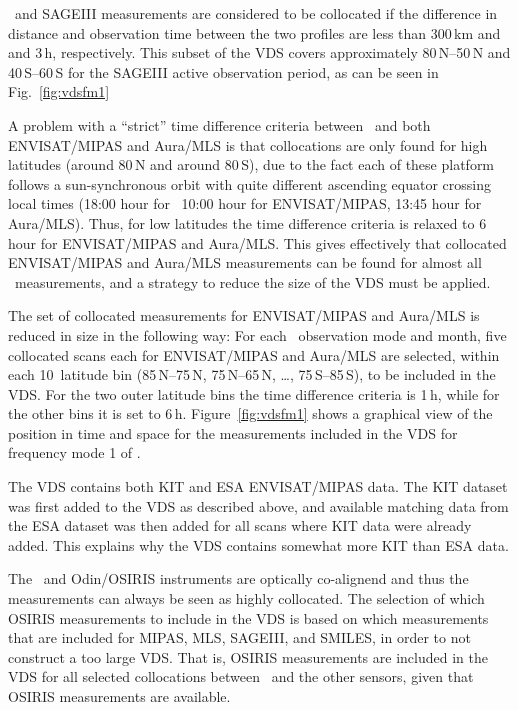 \smr\ and SAGEIII measurements are considered to be collocated if the 
difference in distance and observation time between the two profiles are
less than 300\,km and and 3\,h, respectively.
This subset of the VDS covers approximately 80\degree\,N--50\degree\,N and
40\degree\,S--60\degree\,S for the SAGEIII active observation period, as can
be seen in Fig.~\ref{fig:vdsfm1}

A problem with a ``strict'' time difference criteria
between \smr\ and both ENVISAT/MIPAS and Aura/MLS
is that collocations are only found for high latitudes
 (around 80\degree\,N and around 80\degree\,S),
due to the fact each of these platform follows a sun-synchronous orbit
with quite different ascending equator crossing local times  
(18:00 hour for \smr\, 10:00 hour for ENVISAT/MIPAS,
 13:45 hour for Aura/MLS). 
Thus, for low latitudes the time difference criteria
is relaxed to 6\,hour for ENVISAT/MIPAS and Aura/MLS.
This gives effectively that collocated ENVISAT/MIPAS and Aura/MLS 
measurements can be found for almost all \smr\ measurements, and a strategy
to reduce the size of the VDS must be applied.

The set of collocated measurements for ENVISAT/MIPAS and Aura/MLS is reduced
in size in the following way:
For each \smr\ observation mode and month, five collocated scans each
for ENVISAT/MIPAS and Aura/MLS
are selected, within each 10\degree\ latitude bin
(85\degree\,N--75\degree\,N, 75\degree\,N--65\degree\,N, \ldots, 75\degree\,S--85\degree\,S),
to be included in the VDS. For the two outer latitude bins the
time difference criteria is 1\,h, while for the other bins it is set to 6\,h.
Figure~\ref{fig:vdsfm1} shows a graphical view of the position in
time and space for the measurements included in the VDS for
frequency mode 1 of \smr.

The VDS contains both KIT and ESA ENVISAT/MIPAS data. The KIT dataset was first
added to the VDS as described above, and available matching data from the ESA dataset was
then added for all scans where KIT data were already added. This explains
why the VDS contains somewhat more KIT than ESA data.  

The \smr\ and Odin/OSIRIS instruments are optically co-alignend and thus
the measurements can always be seen as highly collocated.
The selection of which OSIRIS measurements to include in the
VDS is based on which measurements that are included 
for MIPAS, MLS, SAGEIII, and SMILES, in order to not
construct a too large VDS.  That is,
OSIRIS measurements are included in the VDS for all selected
collocations between \smr\ and the other sensors, given
that OSIRIS measurements are available. 

